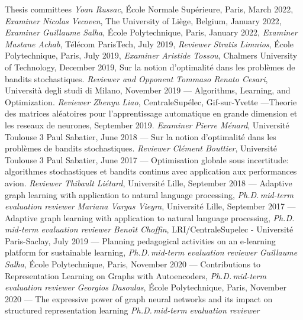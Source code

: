\documentclass{resume}
\begin{document}
\begin{category}{Thesis committees}
\citembullet \emph{Yoan Russac}, \'Ecole Normale Sup\'erieure, Paris, March 2022, \emph{Examiner}
\citembullet \emph{Nicolas Vecoven}, The University of Li\`ege, Belgium, January 2022, \emph{Examiner}
\citembullet \emph{Guillaume Salha}, \'Ecole Polytechnique, Paris, January 2022,  \emph{Examiner}
\citembullet \emph{Mastane Achab}, T\' el\'ecom ParisTech,  July 2019, \emph{Reviewer}
\citembullet \emph{Stratis Limnios},  \'Ecole Polytechnique, Paris, July 2019, \emph{Examiner}
\citembullet \emph{Aristide Tossou}, Chalmers University of Technology, December 2019, 
Sur la notion d'optimalit\'e dans les probl\`emes de bandits stochastiques. \emph{Reviewer and Opponent}
\citembullet \emph{Tommaso Renato Cesari}, Universit\`a degli studi di Milano, November 2019 --- 
Algorithms, Learning, and Optimization. \emph{Reviewer}
\citembullet \emph{Zhenyu Liao}, CentraleSup\'elec, Gif-sur-Yvette ---Theorie des matrices al\'eatoires pour l’apprentissage automatique en grande
dimension et les reseaux de neurones, September 2019. \emph{Examiner}
\citembullet \emph{Pierre M\'enard}, Universit\'e Toulouse 3 Paul Sabatier, June 2018 ---
Sur la notion d'optimalit\'e dans les probl\`emes de bandits stochastiques. \emph{Reviewer}
\citembullet \emph{Cl\'ement Bouttier}, Universit\'e Toulouse 3 Paul Sabatier, June 2017 ---
Optimisation globale sous incertitude: algorithmes stochastiques et
bandits continus avec application aux performances avion. 
\emph{Reviewer}
\citembullet \emph{Thibault Li\' etard}, Universit\'e Lille, September 2018 ---
Adaptive graph learning with application
to natural language processing,
\emph{Ph.D.\,mid-term evaluation reviewer}
\citembullet \emph{Mariana Vargas Vieyra}, Universit\'e Lille, September 2017 ---
Adaptive graph learning with application to natural language processing,
\emph{Ph.D.\,mid-term evaluation reviewer}
\citembullet \emph{Beno\^{ı}t Choffin}, LRI/CentraleSupelec - Universit\'e Paris-Saclay, July 2019  ---
Planning pedagogical activities on an e-learning platform for
sustainable learning,
\emph{Ph.D.\,mid-term evaluation reviewer}
\citembullet \emph{Guillaume Salha}, \'Ecole Polytechnique, Paris, November 2020  ---
Contributions to Representation Learning on Graphs with Autoencoders,
\emph{Ph.D.\,mid-term evaluation reviewer}
\citembullet \emph{Georgios Dasoulas}, \'Ecole Polytechnique, Paris, November 2020 ---
The expressive power of graph neural networks and its impact on structured representation learning
\emph{Ph.D.\,mid-term evaluation reviewer}
\end{category}
\end{document}
